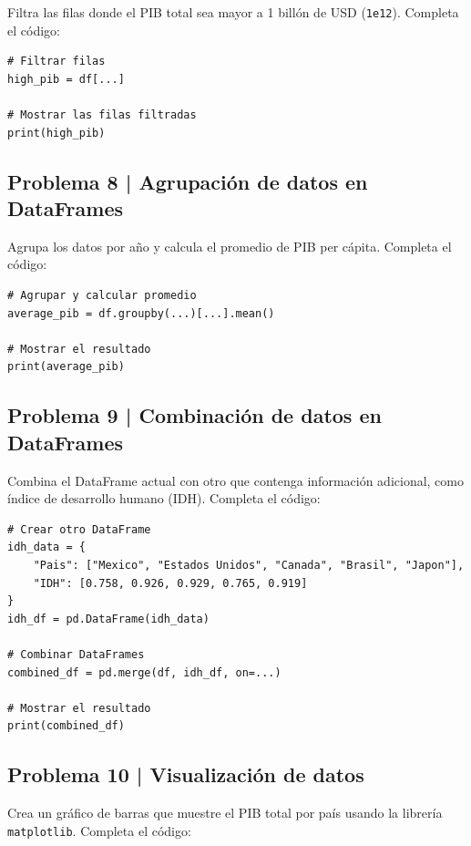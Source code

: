 \documentclass{article}
\begin{document}
Filtra las filas donde el PIB total sea mayor a 1 billón de USD (\texttt{1e12}). Completa el código:

\begin{lstlisting}[style=python]
# Filtrar filas
high_pib = df[...]

# Mostrar las filas filtradas
print(high_pib)
\end{lstlisting}

\clearpage

\subsection*{Problema 8 | Agrupación de datos en DataFrames}

Agrupa los datos por año y calcula el promedio de PIB per cápita. Completa el código:

\begin{lstlisting}[style=python]
# Agrupar y calcular promedio
average_pib = df.groupby(...)[...].mean()

# Mostrar el resultado
print(average_pib)
\end{lstlisting}

\clearpage

\subsection*{Problema 9 | Combinación de datos en DataFrames}

Combina el DataFrame actual con otro que contenga información adicional, como índice de desarrollo humano (IDH). Completa el código:

\begin{lstlisting}[style=python]
# Crear otro DataFrame
idh_data = {
    "Pais": ["Mexico", "Estados Unidos", "Canada", "Brasil", "Japon"],
    "IDH": [0.758, 0.926, 0.929, 0.765, 0.919]
}
idh_df = pd.DataFrame(idh_data)

# Combinar DataFrames
combined_df = pd.merge(df, idh_df, on=...)

# Mostrar el resultado
print(combined_df)
\end{lstlisting}

\clearpage

\subsection*{Problema 10 | Visualización de datos}

Crea un gráfico de barras que muestre el PIB total por país usando la librería \texttt{matplotlib}. Completa el código:
\end{document}
